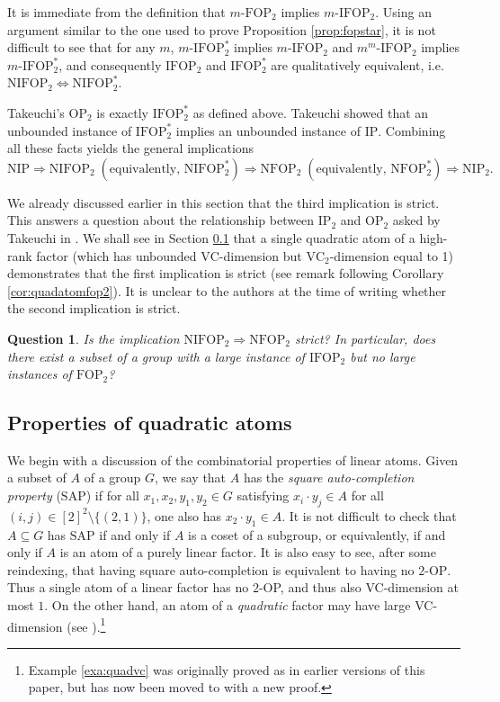 \documentclass[12pt,oneside,british,a4wide]{amsart}
\newtheorem{question}[theorem]{Question}
\numberwithin{equation}{section}
\theoremstyle{definition}
\def\OP{\mathrm{OP}}
\def\FOP{\mathrm{FOP}}
\def\NFOP{\mathrm{NFOP}}
\def\IP{\mathrm{IP}}
\def\NIP{\mathrm{NIP}}
\def\VC{\mathrm{VC}}
\def\IFOP{\mathrm{IFOP}}
\begin{document}
It is immediate from the definition that $m$-$\FOP_2$ implies $m$-$\IFOP_2$. Using an argument similar to the one used to prove Proposition \ref{prop:fopstar}, it is not difficult to see that for any $m$, $m$-$\text{IFOP}^*_2$ implies $m$-$\IFOP_2$ and $m^m$-$\IFOP_2$ implies $m$-$\text{IFOP}_2^*$, and consequently $\IFOP_2$ and $\IFOP_2^*$ are qualitatively equivalent, i.e. $\mathrm{NIFOP}_2 \Leftrightarrow \mathrm{NIFOP}_2^*$. 

Takeuchi's $\OP_2$ is exactly $\IFOP^*_2$ as defined above. Takeuchi showed that an unbounded instance of $\IFOP^*_2$ implies an unbounded instance of $\IP$. Combining all these facts yields the general implications
\[\NIP\Rightarrow \mathrm{NIFOP}_2\; (\mbox{equivalently, } \mathrm{NIFOP}^*_2) \Rightarrow \NFOP_2 \; (\mbox{equivalently, }  \NFOP_2^*)\Rightarrow \NIP_2.\]

We already discussed earlier in this section that the third implication is strict. This answers a question about the relationship between $\IP_2$ and $\OP_2$ asked by Takeuchi in \cite{Takeuchi.2018}. We shall see in Section \ref{subsec:atomsprops} that a single quadratic atom of a high-rank factor (which has unbounded $\VC$-dimension but $\VC_2$-dimension equal to 1) demonstrates that the first implication is strict (see remark following Corollary \ref{cor:quadatomfop2}). It is unclear to the authors at the time of writing whether the second implication is strict.  

 

\begin{question}\label{que:op2vsfop2}
Is the implication $\mathrm{NIFOP}_2 \Rightarrow \mathrm{NFOP}_2$ strict? In particular, does there exist a subset of a group  with a large instance of $\mathrm{IFOP}_2$ but no large instances of $\FOP_2$?
\end{question}
 

\subsection{Properties of quadratic atoms}\label{subsec:atomsprops}

We begin with a discussion of the combinatorial properties of linear atoms. Given a subset of $A$ of a group $G$, we say that $A$ has the \emph{square auto-completion property} ($\mathrm{SAP}$) if  for all $x_1,x_2,y_1,y_2\in G$ satisfying $x_i\cdot y_j\in A$ for all $(i,j)\in [2]^2\setminus \{(2,1)\}$, one also has $x_2\cdot y_1\in A$. It is not difficult to check that $A\subseteq G$ has  $\mathrm{SAP}$ if and only if $A$ is a coset of a subgroup, or equivalently, if and only if $A$ is an atom of a purely linear factor.  It is also easy to see, after some reindexing, that having square auto-completion is equivalent to having no $2$-$\OP$. Thus a single atom of a linear factor has no $2$-OP, and thus also VC-dimension at most $1$.  On the other hand, an atom of a \emph{quadratic} factor may have large VC-dimension (see \cite[Lemma 3.9]{Terry.2021d}).\footnote{Example \ref{exa:quadvc} was originally proved as \cite[Example 5.1]{Terry.2021av2} in earlier versions of this paper, but has now been moved to \cite{Terry.2021d} with a new proof.}
\end{document}
